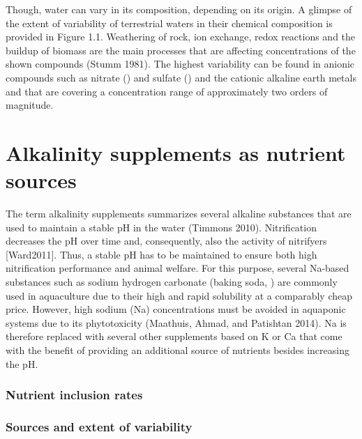 \documentclass[preprint, 3p,
authoryear]{elsarticle} %
\begin{document}
Though, water can vary in its composition, depending on its origin. A
glimpse of the extent of variability of terrestrial waters in their
chemical composition is provided in Figure 1.1. Weathering of rock, ion
exchange, redox reactions and the buildup of biomass are the main
processes that are affecting concentrations of the shown compounds
(Stumm 1981). The highest variability can be found in anionic compounds
such as nitrate () and sulfate () and the cationic
alkaline earth metals  and  that are covering a
concentration range of approximately two orders of magnitude.

\hypertarget{alkalinity-supplements-as-nutrient-sources}{%
\section{Alkalinity supplements as nutrient
sources}\label{alkalinity-supplements-as-nutrient-sources}}

The term alkalinity supplements summarizes several alkaline substances
that are used to maintain a stable pH in the water (Timmons 2010).
Nitrification decreases the pH over time and, consequently, also the
activity of nitrifyers {[}Ward2011{]}. Thus, a stable pH has to be
maintained to ensure both high nitrification performance and animal
welfare. For this purpose, several Na-based substances such as sodium
hydrogen carbonate (baking soda, ) are commonly used in
aquaculture due to their high and rapid solubility at a comparably cheap
price. However, high sodium (Na) concentrations must be avoided in
aquaponic systems due to its phytotoxicity (Maathuis, Ahmad, and
Patishtan 2014). Na is therefore replaced with several other supplements
based on K or Ca that come with the benefit of providing an additional
source of nutrients besides increasing the pH.

\hypertarget{nutrient-inclusion-rates-2}{%
\subsubsection{Nutrient inclusion
rates}\label{nutrient-inclusion-rates-2}}

\hypertarget{sources-and-extent-of-variability-2}{%
\subsubsection{Sources and extent of
variability}\label{sources-and-extent-of-variability-2}}
\end{document}
